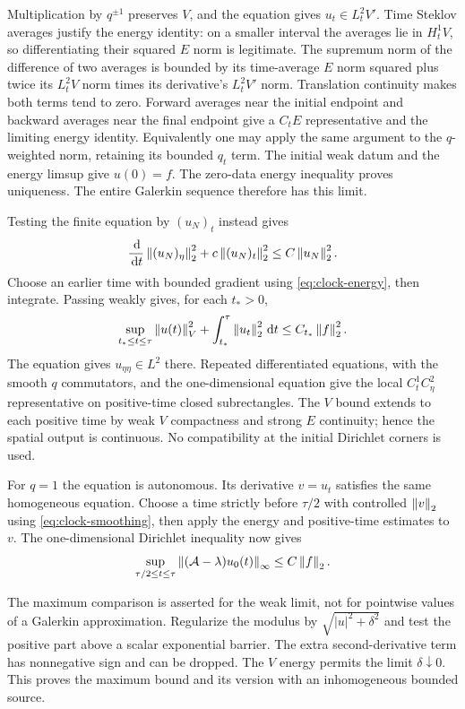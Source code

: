 Multiplication by $q^{\pm1}$ preserves $V$, and the equation
gives $u_t\in L^2_tV'$. Time Steklov averages justify the
energy identity: on a smaller interval the averages lie in
$H^1_tV$, so differentiating their squared $E$ norm is
legitimate. The supremum norm of the difference of two
averages is bounded by its time-average $E$ norm squared
plus twice its $L^2_tV$ norm times its derivative's
$L^2_tV'$ norm. Translation continuity makes both terms
tend to zero. Forward averages near the initial endpoint
and backward averages near the final endpoint give a
$C_tE$ representative and the limiting energy identity.
Equivalently one may apply the same argument to the
$q$-weighted norm, retaining its bounded $q_t$ term.
The initial weak datum and the energy limsup give $u(0)=f$.
The zero-data energy inequality proves uniqueness. The
entire Galerkin sequence therefore has this limit.

Testing the finite equation by $(u_N)_t$ instead gives
\[
 \frac{\,\mathrm d}{\,\mathrm d t}\left\|(u_N)_\eta\right\|_2^2
       +c\left\|(u_N)_t\right\|_2^2\le C\left\|u_N\right\|_2^2 .
\]
Choose an earlier time with bounded gradient using
\eqref{eq:clock-energy}, then integrate. Passing weakly
gives, for each $t_*>0$,
\begin{equation}\label{eq:clock-smoothing}
 \sup_{t_*\le t\le\tau}\left\|u(t)\right\|_V^2
       +\int_{t_*}^\tau\left\|u_t\right\|_2^2\,\mathrm d t
       \le C_{t_*}\left\|f\right\|_2^2 .
\end{equation}
The equation gives $u_{\eta\eta}\in L^2$ there.
Repeated differentiated equations, with the smooth $q$
commutators, and the one-dimensional equation give the
local $C^1_tC^2_\eta$ representative on positive-time
closed subrectangles. The $V$ bound extends to each
positive time by weak $V$ compactness and strong $E$
continuity; hence the spatial output is continuous.
No compatibility at the initial Dirichlet corners is used.

For $q=1$ the equation is autonomous. Its derivative $v=u_t$
satisfies the same homogeneous equation. Choose a time
strictly before $\tau/2$ with controlled $\left\|v\right\|_2$ using
\eqref{eq:clock-smoothing}, then apply the energy and
positive-time estimates to $v$. The one-dimensional
Dirichlet inequality now gives
\begin{equation}\label{eq:clock-autonomous-derivative}
 \sup_{\tau/2\le t\le\tau}
       \left\|(\mathcal A-\lambda)u_0(t)\right\|_\infty
       \le C\left\|f\right\|_2 .
\end{equation}

The maximum comparison is asserted for the weak limit,
not for pointwise values of a Galerkin approximation.
Regularize the modulus by $\sqrt{|u|^2+\delta^2}$ and test
the positive part above a scalar exponential barrier.
The extra second-derivative term has nonnegative sign
and can be dropped. The $V$ energy permits the limit
$\delta\downarrow0$. This proves the maximum bound
and its version with an inhomogeneous bounded source.

